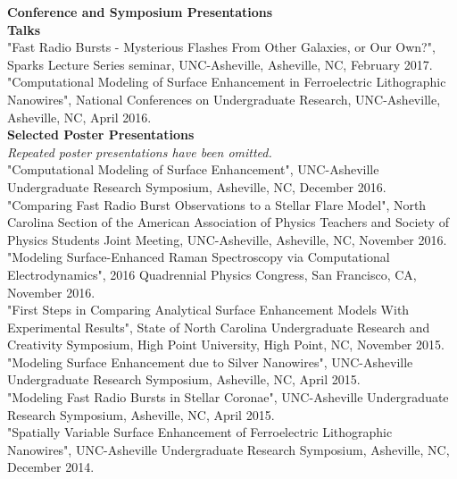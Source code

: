 \documentclass[a4paper, 11pt]{article}
\newcommand{\noi}{\noindent}
\begin{document}
\noi \textbf{Conference and Symposium Presentations}
\\

\noi \textbf{Talks}
\\

\noi "Fast Radio Bursts - Mysterious Flashes From Other Galaxies, or Our Own?", Sparks Lecture Series seminar, UNC-Asheville, Asheville, NC, February 2017.
\\

\noi "Computational Modeling of Surface Enhancement in Ferroelectric Lithographic Nanowires", National Conferences on Undergraduate Research, UNC-Asheville, Asheville, NC, April 2016.
\\

\noi \textbf{Selected Poster Presentations}
\\
\emph{Repeated poster presentations have been omitted.}
\\

\noi "Computational Modeling of Surface Enhancement", UNC-Asheville Undergraduate Research Symposium, Asheville, NC, December 2016.
\\

\noi "Comparing Fast Radio Burst Observations to a Stellar Flare Model", North Carolina Section of the American Association of Physics Teachers and Society of Physics Students Joint Meeting, UNC-Asheville, Asheville, NC, November 2016.
\\

\noi "Modeling Surface-Enhanced Raman Spectroscopy via Computational Electrodynamics", 2016 Quadrennial Physics Congress, San Francisco, CA, November 2016.
\\

\noi "First Steps in Comparing Analytical Surface Enhancement Models With Experimental Results", State of North Carolina Undergraduate Research and Creativity Symposium, High Point University, High Point, NC, November 2015.
\\

\noi "Modeling Surface Enhancement due to Silver Nanowires", UNC-Asheville Undergraduate Research Symposium, Asheville, NC, April 2015.
\\

\noi "Modeling Fast Radio Bursts in Stellar Coronae", UNC-Asheville Undergraduate Research Symposium, Asheville, NC, April 2015.
\\

\noi "Spatially Variable Surface Enhancement of
Ferroelectric Lithographic Nanowires", UNC-Asheville Undergraduate Research Symposium, Asheville, NC, December 2014.
\\
\end{document}
